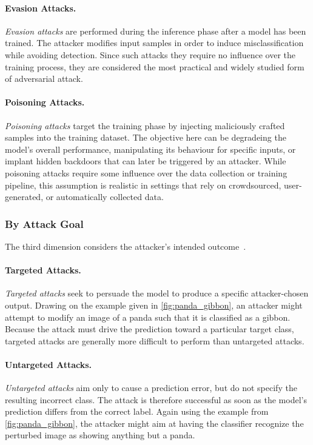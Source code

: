 \documentclass[review]{AIM_report}
\begin{document}
\paragraph{Evasion Attacks.}
\textit{Evasion attacks} are performed during the inference phase after a model has been trained. The attacker modifies input samples in order to induce misclassification while avoiding detection. Since such attacks they require no influence over the training process, they are considered the most practical and widely studied form of adversarial attack.

\paragraph{Poisoning Attacks.}
\textit{Poisoning attacks} target the training phase by injecting maliciously crafted samples into the training dataset. The objective here can be degradeing the model's overall performance, manipulating its behaviour for specific inputs, or implant hidden backdoors that can later be triggered by an attacker. While poisoning attacks require some influence over the data collection or training pipeline, this assumption is realistic in settings that rely on crowdsourced, user-generated, or automatically collected data.

\subsubsection{By Attack Goal}

The third dimension considers the attacker's intended outcome~\cite{chakraborty2018adversarial,costa2024deep,brendel2017decision}.

\paragraph{Targeted Attacks.}
\textit{Targeted attacks} seek to persuade the model to produce a specific attacker-chosen output. Drawing on the example given in \ref{fig:panda_gibbon}, an attacker might attempt to modify an image of a panda such that it is classified as a gibbon. Because the attack must drive the prediction toward a particular target class, targeted attacks are generally more difficult to perform than untargeted attacks.

\paragraph{Untargeted Attacks.}
\textit{Untargeted attacks} aim only to cause a prediction error, but do not specify the resulting incorrect class. The attack is therefore successful as soon as the model's prediction differs from the correct label. Again using the example from \ref{fig:panda_gibbon}, the attacker might aim at having the classifier recognize the perturbed image as showing anything but a panda.
\end{document}
